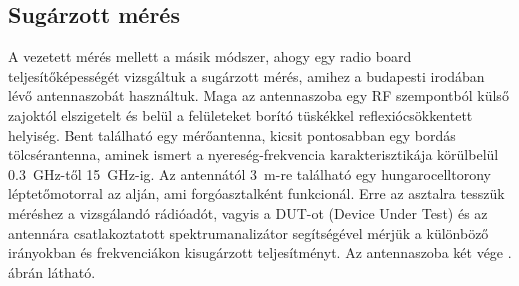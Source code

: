         \subsection{Sugárzott mérés}
            A vezetett mérés mellett a másik módszer, ahogy egy radio board teljesítőképességét vizsgáltuk a sugárzott mérés, amihez a budapesti irodában lévő antennaszobát használtuk. Maga az antennaszoba egy RF szempontból külső zajoktól elszigetelt és belül a felületeket borító tüskékkel reflexiócsökkentett helyiség. Bent található egy mérőantenna, kicsit pontosabban egy bordás tölcsérantenna, aminek ismert a nyereség-frekvencia karakterisztikája körülbelül \SI{0,3}{GHz}-től \SI{15}{GHz}-ig. Az antennától \SI{3}{m}-re található egy hungarocelltorony léptetőmotorral az alján, ami forgóasztalként funkcionál. Erre az asztalra tesszük méréshez a vizsgálandó rádióadót, vagyis a DUT-ot (Device Under Test) és az antennára csatlakoztatott spektrumanalizátor segítségével mérjük a különböző irányokban és frekvenciákon kisugárzott teljesítményt. Az antennaszoba két vége . ábrán látható.
